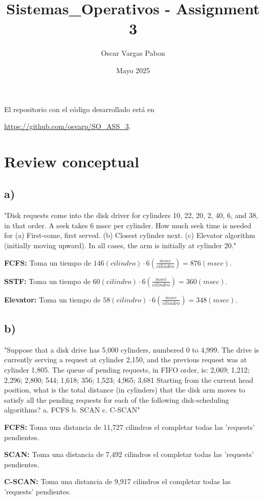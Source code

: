 \documentclass{article}
\title{Sistemas\_Operativos - Assignment 3}
\author{Oscar Vargas Pabon}
\date{Mayo 2025}
\theoremstyle{definition}
\begin{document}
	\maketitle
	\tableofcontents
	
	El repositorio con el código desarrollado está en 
	
	 \url{https://github.com/osvarp/SO_ASS_3}.
\section{Review conceptual}
\subsection{a)}
	"Disk requests come into the disk driver for cylinders 10, 22,
	20, 2, 40, 6, and 38, in that order. A seek takes 6 msec per
	cylinder. How much seek time is needed for (a) First-come,
	first served. (b) Closest cylinder next. (c) Elevator
	algorithm (initially moving upward). In all cases, the arm is
	initially at cylinder 20."
	
	\textbf{FCFS: }
	Toma un tiempo de $146 (cilindro) \cdot 6 (\frac{msec}{cilindro}) = 876 (msec)$.
	
	\textbf{SSTF: }
	Toma un tiempo de $60 (cilindro) \cdot 6 (\frac{msec}{cilindro}) = 360 (msec)$.
	
	\textbf{Elevator: }
	Toma un tiempo de $58 (cilindro) \cdot 6 (\frac{msec}{cilindro}) = 348 (msec)$.

\subsection{b)}
	"Suppose that a disk drive has 5,000 cylinders, numbered 0 to
	4,999. The drive is currently serving a request at cylinder
	2,150, and the previous request was at cylinder 1,805. The
	queue of pending requests, in FIFO order, is: 2,069; 1,212;
	2,296; 2,800; 544; 1,618; 356; 1,523; 4,965; 3,681 Starting
	from the current head position, what is the total distance (in
	cylinders) that the disk arm moves to satisfy all the pending
	requests for each of the following disk-scheduling algorithms?
	a. FCFS b. SCAN c. C-SCAN"
	
	\textbf{FCFS: }
	Toma una distancia de 11,727 cilindros el completar todas las 'requests' pendientes.
	
	\textbf{SCAN: }
	Toma una distancia de 7,492 cilindros el completar todas las 'requests' pendientes.
	
	\textbf{C-SCAN: }
	Toma una distancia de 9,917 cilindros el completar todas las 'requests' pendientes.
	
\end{document}

